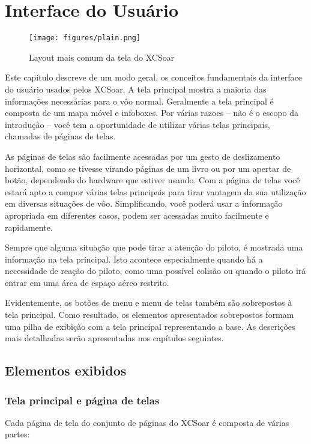 \chapter{Interface do Usuário}\label{cha:interface}
\begin{figure}[h]
\texttt{[image: figures/plain.png]}
\caption{Layout mais comum da tela do XCSoar}
\end{figure}

Este capítulo descreve de um modo geral, os conceitos fundamentais da interface do usuário usados pelos XCSoar.  A tela principal mostra a maioria das informações necessárias para o vôo normal.   Geralmente a tela principal é composta de um mapa móvel e infoboxes.  Por várias razoes – não é o escopo da introdução – você tem a oportunidade de utilizar várias telas principais, chamadas de páginas de telas.

As páginas de telas são facilmente acessadas por um gesto de deslizamento horizontal, como se tivesse virando páginas de um livro ou por um apertar de botão, dependendo do hardware que estiver usando.  Com a página de telas você estará apto a compor várias telas principais para tirar vantagem da sua utilização em diversas situações de vôo.  Simplificando, você poderá usar a informação apropriada em diferentes casos, podem ser acessadas muito facilmente e rapidamente.

Sempre que alguma situação que pode tirar a atenção do piloto, é mostrada uma informação na tela principal.  Isto acontece especialmente quando há a necessidade de reação do piloto, como uma possível colisão ou quando o piloto irá entrar em uma área de espaço aéreo restrito.

Evidentemente, os botões de menu e menu de telas também são sobrepostos à tela principal.  Como resultado, os elementos apresentados sobrepostos formam uma pilha de exibição com a tela principal representando a base.  As descrições mais detalhadas serão apresentadas nos capítulos seguintes. 


\section{Elementos exibidos}
\subsection*{Tela principal e página de telas}
Cada página de tela do conjunto de páginas do XCSoar é composta de várias partes:

